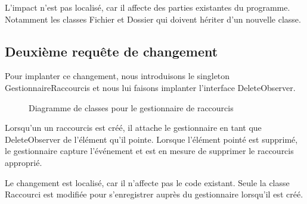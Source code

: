 \documentclass{article}
\begin{document}
  L'impact n'est pas localisé, car il affecte des parties existantes du
  programme. Notamment les classes \textsf{Fichier} et \textsf{Dossier} qui
  doivent hériter d'un nouvelle classe.

  \subsection{Deuxième requête de changement}
  Pour implanter ce changement, nous introduisons le singleton
  \textsf{GestionnaireRaccourcis} et nous lui faisons implanter l'interface
  \textsf{DeleteObserver}.

  \begin{figure}
    \centering
    \resizebox{\textwidth}{!}{}
    \caption{Diagramme de classes pour le gestionnaire de raccourcis}
  \end{figure}

  Lorsqu'un un raccourcis est créé, il attache le gestionnaire en tant que
  DeleteObserver de l'élément qu'il pointe. Lorsque l'élément pointé est
  supprimé, le gestionnaire capture l'événement et est en mesure de supprimer le
  raccourcis approprié.

  Le changement est localisé, car il n'affecte pas le code existant. Seule
  la classe \textsf{Raccourci} est modifiée pour s'enregistrer auprès du
  gestionnaire lorsqu'il est créé.
\end{document}
